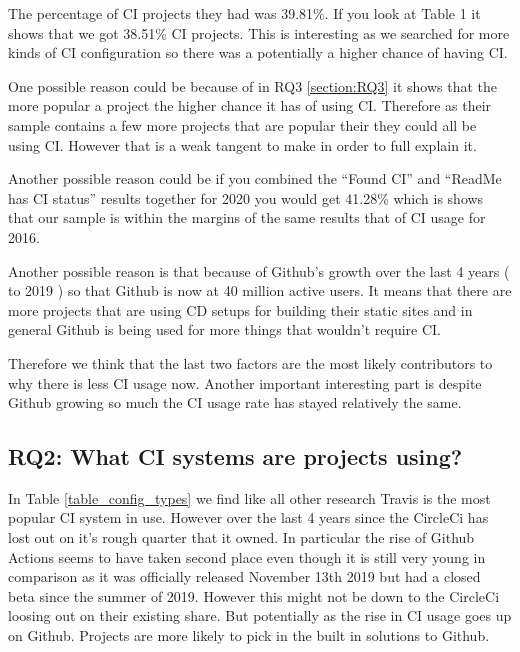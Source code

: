\documentclass[twoside,12pt,titlepage,a4paper]{article}
\begin{document}
The percentage of CI projects they had was 39.81\%. If you look at Table 1 it shows that we got 38.51\% CI projects. This is interesting as we searched for more kinds of CI configuration so there was a potentially a higher chance of having CI.

One possible reason could be because of in RQ3 \ref{section:RQ3} it shows that the more popular a project the higher chance it has of using CI. Therefore as their sample contains a few more projects that are popular their they could all be using CI. However that is a weak tangent to make in order to full explain it.  

Another possible reason could be if you combined the \enquote{Found CI} and \enquote{ReadMe has CI status} results together for 2020 you would get 41.28\% which is shows that our sample is within the margins of the same results that of CI usage for 2016.

Another possible reason is that because of Github's growth over the last 4 years (\citet{GithubOctoverseResults2016} to 2019 \citet{GithubOctoverseResults}) so that Github is now at 40 million active users. It means that there are more projects that are using CD setups for building their static sites and in general Github is being used for more things that wouldn't require CI.

Therefore we think that the last two factors are the most likely contributors to why there is less CI usage now. Another important interesting part is despite Github growing so much the CI usage rate has stayed relatively the same. 



\vspace*{-0.05in}
\subsection{\textbf{RQ2}: What CI systems are projects using?}
\label{section:RQ2}
\vspace*{-0.05in}
In Table \ref{table_config_types} we find like all other research Travis is the most popular CI system in use. However over the last 4 years since the \cite{Github2017} CircleCi has lost out on it's rough quarter that it owned. In particular the rise of Github Actions seems to have taken second place even though it is still very young in comparison as it was officially released November 13th 2019 but had a closed beta since the summer of 2019. However this might not be down to the CircleCi loosing out on their existing share. But potentially as the rise in CI usage goes up on Github. Projects are more likely to pick in the built in solutions to Github.

\end{document}
